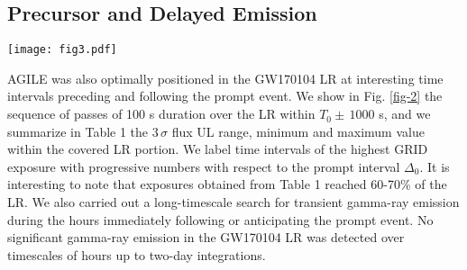 \documentclass[preprint2]{aastex}
\def\gw {GW170104 }
\def \fv {}
\begin{document}
\subsection{Precursor and Delayed Emission}


\begin{figure*}  [t!]
   \centerline{\texttt{[image: fig3.pdf]}}
\caption{Sequence of ($E > 50$ MeV)
maps in Galactic coordinates showing the AGILE-GRID passes with
the best sensitivity {\fv (in $\rm erg\, cm^{-2} s^{-1}$)} over the \gw LR
obtained during the period (- 1000 s, + 1000 s) with respect to
$T_0$. The color maps show the gamma-ray flux 3\,$\sigma$
upper limits in the range 50 MeV--10 GeV with the most
stringent values being $ UL = (1-2) \times 10^{-8} \rm \, erg \,
cm^{-2} \, s^{-1}$. The sequence shows 21 maps for all the one-orbit
passes of Table 1, corresponding to the 100 s interval numbers
(from top left to bottom right): from $-10$ to $+10$. The \gw
LR is marked by the purple contour, the LALinference 90\% {\fv c.l.} \cite[][]{2017GCN..20385...1G}.
} \label{fig-2}
\end{figure*}

AGILE was also optimally positioned in the \gw LR at interesting time intervals
preceding and following the prompt event.
%
We show in Fig. \ref{fig-2} the sequence of passes of 100 s
duration over the LR within $T_0 \pm \,1000$ s, and we summarize in
Table 1 the 3\,$\sigma$ flux UL range, minimum and maximum value
within the covered LR portion. We label time intervals of the highest
GRID exposure with progressive numbers with respect to the prompt
interval $\Delta_0$.
It is interesting to note that exposures obtained from Table 1
reached 60-70\% of the LR.
%
%
We also carried out a long-timescale search for transient
gamma-ray emission during the hours immediately following or
anticipating the prompt event. No significant gamma-ray emission
in the \gw LR was detected over timescales of hours up to two-day integrations.
%
\end{document}
